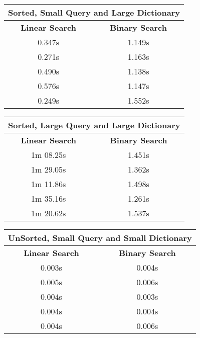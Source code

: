 \documentclass{article}
\begin{document}
\begin{table}[h]
\begin{tabular}{|c|c|}
\hline
\multicolumn{2}{|c|}{\textbf{Sorted, Small Query and Large Dictionary}}     \\ \hline \hline
\textbf{Linear Search} & {\textbf{Binary Search}}   \\ \hline \hline
 0.347s                 &  1.149s                \\ \hline
 0.271s                 &  1.163s               \\ \hline
 0.490s                 &  1.138s               \\ \hline
 0.576s                 &  1.147s               \\ \hline
 0.249s                 &  1.552s               \\ \hline
\end{tabular}
\end{table}
\newpage\newpage
\begin{table}[h]
\begin{tabular}{|c|c|}
\hline
\multicolumn{2}{|c|}{\textbf{Sorted, Large Query and Large Dictionary}}     \\ \hline \hline
\textbf{Linear Search} & {\textbf{Binary Search}}   \\ \hline \hline
 1m 08.25s                 &  1.451s                \\ \hline
 1m 29.05s                 &  1.362s               \\ \hline
 1m 11.86s                 &  1.498s               \\ \hline
 1m 35.16s                 &  1.261s               \\ \hline
 1m 20.62s                 &  1.537s               \\ \hline
\end{tabular}
\end{table}
\begin{table}[h]
\begin{tabular}{|c|c|}
\hline
\multicolumn{2}{|c|}{\textbf{UnSorted, Small Query and Small Dictionary}}     \\ \hline \hline
\textbf{Linear Search} & {\textbf{Binary Search}}   \\ \hline \hline
 0.003s                 &  0.004s                \\ \hline
 0.005s                 &  0.006s               \\ \hline
 0.004s                 &  0.003s               \\ \hline
 0.004s                 &  0.004s               \\ \hline
 0.004s                 &  0.006s               \\ \hline
\end{tabular}
\end{table}
\end{document}
